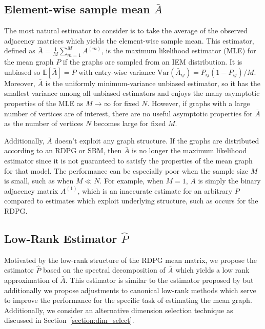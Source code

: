 \documentclass[10pt,letterpaper]{article}
\newcommand{\Ex}{\mathbb{E}}
\renewcommand{\hat}{\widehat}
\begin{document}
\subsection[Element-wise sample mean]{Element-wise sample mean $\bar{A}$}
\label{sec:abar}
The most natural estimator to consider is to take the average of the observed adjacency matrices which yields the element-wise sample mean.
This estimator, defined as $\bar{A}=\frac{1}{M}\sum_{m=1}^M A^{(m)}$, is the  maximum likelihood estimator (MLE) for the mean graph $P$ if the graphs are sampled from an IEM distribution.
It is unbiased so $\Ex[\bar{A}]=P$ with entry-wise variance $\mathrm{Var}(\bar{A}_{ij}) = P_{ij} (1-P_{ij})/M$. Moreover, $\bar{A}$ is the uniformly minimum-variance unbiased estimator, so it has the smallest variance among all unbiased estimators and enjoys the many asymptotic properties of the MLE as $M\to \infty$ for fixed $N$.
However, if graphs with a large number of vertices are of interest, there are no useful asymptotic properties for $\bar{A}$ as the number of vertices $N$ becomes large for fixed $M$.

Additionally, $\bar{A}$ doesn't exploit any graph structure.
If the graphs are distributed according to an RDPG or SBM, then $\bar{A}$ is no longer the maximum likelihood estimator since it is not guaranteed to satisfy the properties of the mean graph for that model.
The performance can be especially poor when the sample size $M$ is small, such as when $M\ll N$.
For example, when $M=1$, $\bar{A}$ is simply the binary adjacency matrix $A^{(1)}$, which is an inaccurate estimate for an arbitrary $P$ compared to estimates which exploit underlying structure, such as occurs for the RDPG.

\subsection[Low-Rank Estimator]{Low-Rank Estimator $\hat{P}$}
\label{sec:phat}

Motivated by the low-rank structure of the RDPG mean matrix, we propose the estimator $\hat{P}$ based on the spectral decomposition of $\bar{A}$ which yields a low rank approximation of $\bar{A}$.
This estimator is similar to the estimator proposed by \citet{chatterjee2015matrix} but additionally
we propose adjustments to canonical low-rank methods which serve to improve the performance for the specific task of estimating the mean graph. 
Additionally, we consider an alternative dimension selection technique as discussed in Section~\ref{section:dim_select}.
\end{document}
